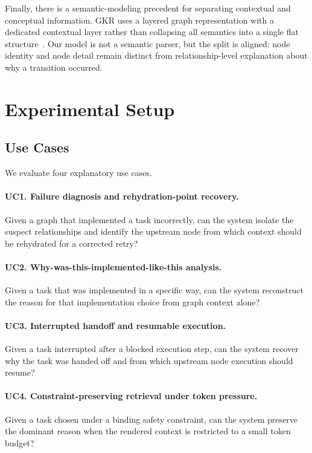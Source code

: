 \documentclass[11pt]{article}
\begin{document}
Finally, there is a semantic-modeling precedent for separating contextual and
conceptual information. GKR uses a layered graph representation with a
dedicated contextual layer rather than collapsing all semantics into a single
flat structure~\citep{kalouli2018gkr}. Our model is not a semantic parser, but
the split is aligned: node identity and node detail remain distinct from
relationship-level explanation about why a transition occurred.

\section{Experimental Setup}

\subsection{Use Cases}

We evaluate four explanatory use cases.

\paragraph{UC1. Failure diagnosis and rehydration-point recovery.}
Given a graph that implemented a task incorrectly, can the system isolate the
suspect relationships and identify the upstream node from which context should
be rehydrated for a corrected retry?

\paragraph{UC2. Why-was-this-implemented-like-this analysis.}
Given a task that was implemented in a specific way, can the system
reconstruct the reason for that implementation choice from graph context
alone?

\paragraph{UC3. Interrupted handoff and resumable execution.}
Given a task interrupted after a blocked execution step, can the system
recover why the task was handed off and from which upstream node execution
should resume?

\paragraph{UC4. Constraint-preserving retrieval under token pressure.}
Given a task chosen under a binding safety constraint, can the system preserve
the dominant reason when the rendered context is restricted to a small token
budget?
\end{document}

